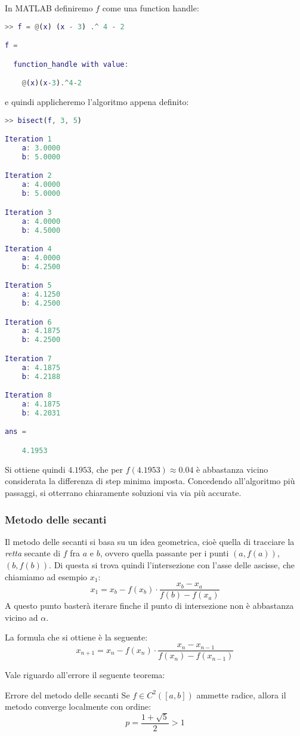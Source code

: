 \documentclass[a4paper,11pt]{article}
\begin{document}
In MATLAB definiremo $f$ come una function handle:
\begin{lstlisting}[language=MATLAB, style=codestyle]	
>> f = @(x) (x - 3) .^ 4 - 2

f =

  function_handle with value:

    @(x)(x-3).^4-2
\end{lstlisting}
e quindi applicheremo l'algoritmo appena definito:
\begin{lstlisting}[language=MATLAB, style=codestyle]	
>> bisect(f, 3, 5)

Iteration 1
	a: 3.0000
	b: 5.0000

Iteration 2
	a: 4.0000
	b: 5.0000

Iteration 3
	a: 4.0000
	b: 4.5000

Iteration 4
	a: 4.0000
	b: 4.2500

Iteration 5
	a: 4.1250
	b: 4.2500

Iteration 6
	a: 4.1875
	b: 4.2500

Iteration 7
	a: 4.1875
	b: 4.2188

Iteration 8
	a: 4.1875
	b: 4.2031

ans =

    4.1953
\end{lstlisting}

Si ottiene quindi $4.1953$, che per $f(4.1953) \approx 0.04$ è abbastanza vicino considerata la differenza di step minima imposta.
Concedendo all'algoritmo più passaggi, si otterrano chiaramente soluzioni via via più accurate.

\subsubsection{Metodo delle secanti}
Il metodo delle secanti si basa su un idea geometrica, cioè quella di tracciare la \textit{retta} secante di $f$ fra $a$ e $b$, ovvero quella passante per i punti $(a, f(a))$, $(b, f(b))$.
Di questa si trova quindi l'intersezione con l'asse delle ascisse, che chiamiamo ad esempio $x_1$:
$$
x_1 = x_b - f(x_b) \cdot \frac{x_b - x_a}{f(b) - f(x_{a})}
$$
A questo punto basterà iterare finche il punto di intersezione non è abbastanza vicino ad $\alpha$.

La formula che si ottiene è la seguente:
$$
x_{n + 1} = x_n - f(x_n) \cdot \frac{x_n - x_{n - 1}}{f(x_n) - f(x_{n - 1})}
$$

Vale riguardo all'errore il seguente teorema:
\begin{theorem}{Errore del metodo delle secanti}
	Se $f \in C^2([a, b])$ ammette radice, allora il metodo converge  localmente con ordine:
	$$
		p = \frac{1 + \sqrt{5}}{2} > 1
	$$
\end{theorem}
\end{document}
